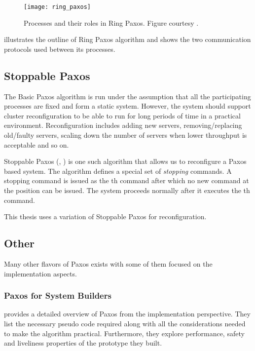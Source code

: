 \begin{figure}
  \texttt{[image: ring\_paxos]}
  \caption[Ring Paxos]{%
  Processes and their roles in Ring Paxos. Figure courtesy
  \citep{MarandiPSP10}.}
  \label{figure:ring.paxos}
\end{figure}

 illustrates the outline of Ring Paxos algorithm and
shows the two communication protocols used between its processes.

\subsection{Stoppable Paxos}

The Basic Paxos algorithm is run under the assumption that all the participating
processes are fixed and form a static system. However, the system should
support cluster reconfiguration to be able to run for long periods of time in a
practical environment. Reconfiguration includes adding new servers,
removing/replacing old/faulty servers, scaling down the number of servers
when lower throughput is acceptable and so on.

Stoppable Paxos (\citet{LamportSP08}, \citet{LamportMZ10}) is one such algorithm
that allows us to reconfigure a Paxos based system. The algorithm defines a
special set of \emph{stopping} commands. A stopping command is issued as the
th command after which no new command at the position can be
issued. The system proceeds normally after it executes the th command.

This thesis uses a variation of Stoppable Paxos for reconfiguration.

\subsection{Other}

Many other flavors of Paxos exists with some of them focused on the
implementation aspects.

\subsubsection{Paxos for System Builders}

\citet{Kirsch08paxosfor} provides a detailed overview of Paxos from the
implementation perspective. They list the necessary pseudo code required
along with all the considerations needed to make the algorithm practical.
Furthermore, they explore performance, safety and liveliness 
properties of the prototype they built.

